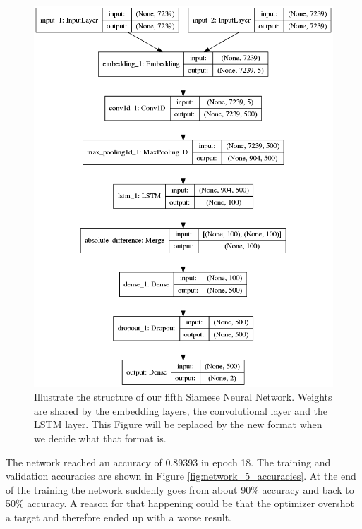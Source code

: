 \begin{figure}
    \centering
    \includegraphics[width=\textwidth]{./pictures/experiments/network5.png}
    \caption{Illustrate the structure of our fifth Siamese Neural Network.
        Weights are shared by the embedding layers, the convolutional layer and
        the LSTM layer. This Figure will be replaced by the new format when we
        decide what that format is.}
    \label{fig:network5}
\end{figure}

The network reached an accuracy of 0.89393 in epoch 18. The training and
validation accuracies are shown in Figure \ref{fig:network_5_accuracies}. At the
end of the training the network suddenly goes from about 90\% accuracy and back
to 50\% accuracy. A reason for that happening could be that the optimizer
overshot a target and therefore ended up with a worse result.

